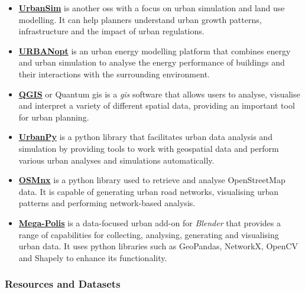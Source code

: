 \documentclass[a4paper, 12pt]{report}
\begin{document}
\begin{itemize}

\item \href{https://github.com/UDST/urbansim}{\textbf{UrbanSim}} is another \acrlong{oss} with a focus on urban simulation and land use modelling. It can help planners understand urban growth patterns, infrastructure and the impact of urban regulations.

\item \href{https://github.com/urbanopt}{\textbf{URBANopt}} is an urban energy modelling platform that combines energy and urban simulation to analyse the energy performance of buildings and their interactions with the surrounding environment.

\item \href{https://github.com/qgis/QGIS}{\textbf{QGIS}} or Quantum \acrshort{gis} is a \textit{\acrfull{gis}} software that allows users to analyse, visualise and interpret a variety of different spatial data, providing an important tool for urban planning.

\item \href{https://github.com/EL-BID/urbanpy}{\textbf{UrbanPy}} is a \Gls{python} library that facilitates urban data analysis and simulation by providing tools to work with geospatial data and perform various urban analyses and simulations automatically.

\item \href{https://github.com/gboeing/osmnx}{\textbf{OSMnx}} is a \Gls{python} library used to retrieve and analyse OpenStreetMap data. It is capable of generating urban road networks, visualising urban patterns and performing network-based analysis.

\item \href{https://github.com/victorcalixto/mega-polis}{\textbf{Mega-Polis}} is a data-focused urban add-on for \textit{Blender} that provides a range of capabilities for collecting, analysing, generating and visualising urban data. It uses \Gls{python} libraries such as GeoPandas, NetworkX, OpenCV and Shapely to enhance its functionality.

\end{itemize}

\subsubsection{Resources and Datasets}\label{subsec:resources-and-datasets}
\end{document}
